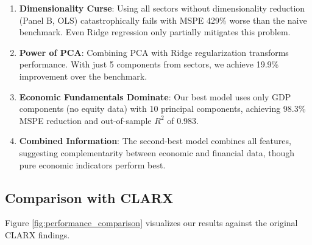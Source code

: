 \documentclass[11pt,letterpaper]{article}
\theoremstyle{plain}
\theoremstyle{definition}
\theoremstyle{remark}
\begin{document}
\begin{enumerate}
\item \textbf{Dimensionality Curse}: Using all sectors without dimensionality reduction (Panel B, OLS) catastrophically fails with MSPE 429\% worse than the naive benchmark. Even Ridge regression only partially mitigates this problem.

\item \textbf{Power of PCA}: Combining PCA with Ridge regularization transforms performance. With just 5 components from sectors, we achieve 19.9\% improvement over the benchmark.

\item \textbf{Economic Fundamentals Dominate}: Our best model uses only GDP components (no equity data) with 10 principal components, achieving 98.3\% MSPE reduction and out-of-sample $R^2$ of 0.983.

\item \textbf{Combined Information}: The second-best model combines all features, suggesting complementarity between economic and financial data, though pure economic indicators perform best.
\end{enumerate}

\subsection{Comparison with CLARX}

Figure \ref{fig:performance_comparison} visualizes our results against the original CLARX findings.
\end{document}
